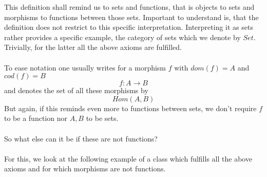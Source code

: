 \documentclass[17pt]{extarticle}
\begin{document}
This definition shall remind us to sets and functions, that is objects to sets and morphisms to
functions between those sets. Important to understand is, that the definition does not restrict to
this specific interpretation. Interpreting it as sets rather provides a specific example, the category of sets which we denote by $Set$. Trivially, for the latter all the above axioms are fulfilled.\\ \\

To ease notation one usually writes for a morphism $f$ with $dom(f)=A$ and $cod(f)=B$
$$
f:A\rightarrow B
$$
and denotes the set of all these morphisms by
$$Hom(A,B)$$
But again, if this reminds even more to functions between sets, we don't require $f$ to be a function nor
$A, B$ to be sets.\\ \\
So what else can it be if these are not functions?\\ \\
For this, we look at the following example of a class which fulfills all the above axioms and for which
morphisms are not functions.\\ \\
\end{document}
